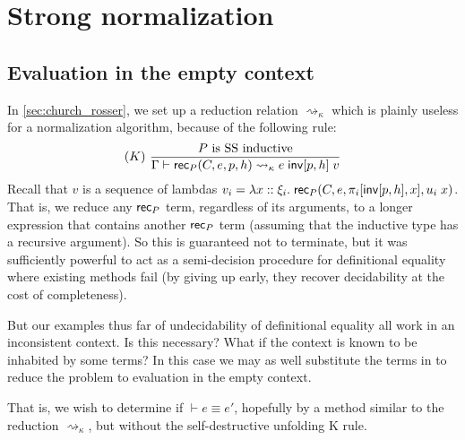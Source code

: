 \section{Strong normalization}
\subsection{Evaluation in the empty context}
In \autoref{sec:church_rosser}, we set up a reduction relation $\rightsquigarrow_\kappa$ which is plainly useless for a normalization algorithm, because of the following rule:
$$(K)\ \frac{P\mbox{ is SS inductive}}{\Gamma\vdash \rec_P(C,e,p,h)\rightsquigarrow_\kappa e\;\inv[p,h]\;v}$$
Recall that $v$ is a sequence of lambdas $v_i=\lambda x::\xi_i.\;\mathsf{rec}_P(C,e,\pi_i[\mathsf{inv}[p,h],x],u_i\;x)$. That is, we reduce any $\mathsf{rec}_P$ term, regardless of its arguments, to a longer expression that contains another $\mathsf{rec}_P$ term (assuming that the inductive type has a recursive argument). So this is guaranteed not to terminate, but it was sufficiently powerful to act as a semi-decision procedure for definitional equality where existing methods fail (by giving up early, they recover decidability at the cost of completeness).

But our examples thus far of undecidability of definitional equality all work in an inconsistent context. Is this necessary? What if the context is known to be inhabited by some terms? In this case we may as well substitute the terms in to reduce the problem to evaluation in the empty context.

That is, we wish to determine if $\vdash e\equiv e'$, hopefully by a method similar to the reduction $\rightsquigarrow_\kappa$, but without the self-destructive unfolding K rule.
